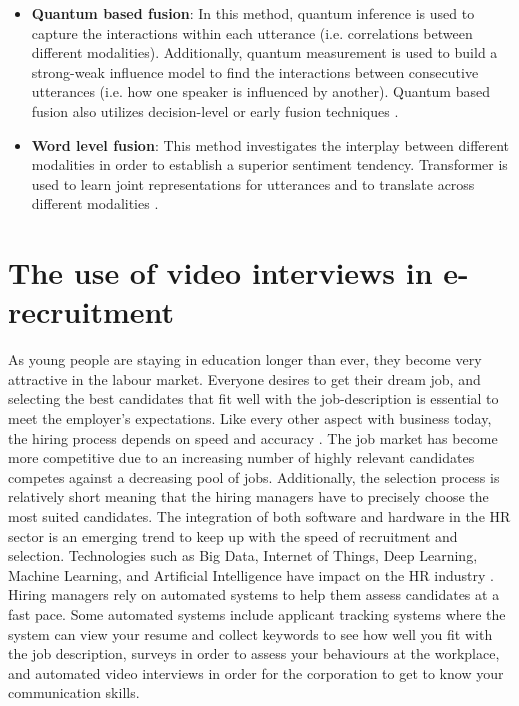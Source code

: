 \begin{itemize}
    \item \textbf{Quantum based fusion}: In this method, quantum inference is used to capture the interactions within each utterance (i.e. correlations between different modalities). Additionally, quantum measurement is used to build a strong-weak influence model to find the interactions between consecutive utterances (i.e. how one speaker is influenced by another). Quantum based fusion also utilizes decision-level or early fusion techniques \cite{MSA-review-3-9686504}. 
    \item \textbf{Word level fusion}: This method investigates the interplay between different modalities in order to establish a superior sentiment tendency. Transformer is used to learn joint representations for utterances and to translate across different modalities \cite{MSA_review2_GANDHI2023424}. 
\end{itemize}

\section{The use of video interviews in e-recruitment}
As young people are staying in education longer than ever, they become very attractive in the labour market. Everyone desires to get their dream job, and selecting the best candidates that fit well with the job-description is essential to meet the employer's expectations. Like every other aspect with business today, the hiring process depends on speed and accuracy \cite{hiring-process-Sołek-BorowskaWilczewska+2018+25+33}. The job market has become more competitive due to an increasing number of highly relevant candidates competes against a decreasing pool of jobs. Additionally, the selection process is relatively short meaning that the hiring managers have to precisely choose the most suited candidates. The integration of both software and hardware in the HR sector is an emerging trend to keep up with the speed of recruitment and selection. Technologies such as Big Data, Internet of Things, Deep Learning, Machine Learning, and Artificial Intelligence have impact on the HR industry \cite{robotic-process-nawaz2019robotic}. Hiring managers rely on automated systems to help them assess candidates at a fast pace. Some automated systems include  applicant tracking systems \cite{ATS2015} where the system can view your resume and collect keywords to see how well you fit with the job description, surveys \cite{ONEILL2013162} in order to assess your behaviours at the workplace, and automated video interviews \cite{Chen2017_video_interview} in order for the corporation to get to know your communication skills.   \\

